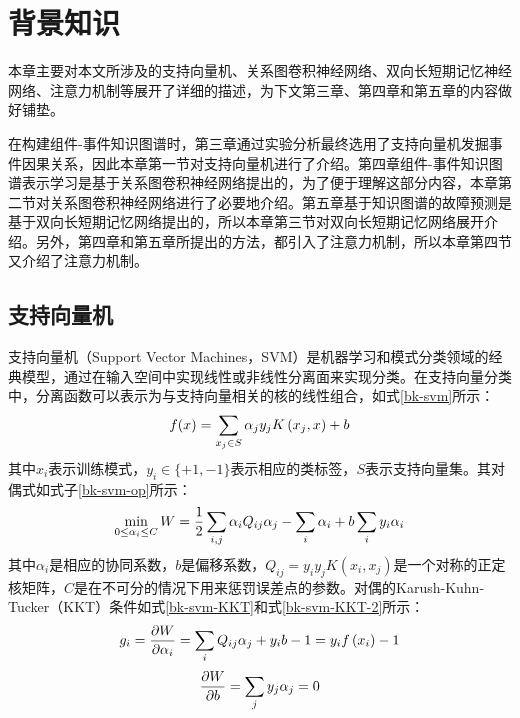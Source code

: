 \chapter{背景知识}
本章主要对本文所涉及的支持向量机、关系图卷积神经网络、双向长短期记忆神经网络、注意力机制等展开了详细的描述，为下文第三章、第四章和第五章的内容做好铺垫。

在构建组件-事件知识图谱时，第三章通过实验分析最终选用了支持向量机发掘事件因果关系，因此本章第一节对支持向量机进行了介绍。第四章组件-事件知识图谱表示学习是基于关系图卷积神经网络提出的，为了便于理解这部分内容，本章第二节对关系图卷积神经网络进行了必要地介绍。第五章基于知识图谱的故障预测是基于双向长短期记忆网络提出的，所以本章第三节对双向长短期记忆网络展开介绍。另外，第四章和第五章所提出的方法，都引入了注意力机制，所以本章第四节又介绍了注意力机制。

\section{支持向量机}
支持向量机（Support Vector Machines，SVM）是机器学习和模式分类领域的经典模型\cite{cherkassky2004practical}，通过在输入空间中实现线性或非线性分离面来实现分类。在支持向量分类中，分离函数可以表示为与支持向量相关的核的线性组合，如式\ref{bk-svm}所示：
\begin{equation}
    \centering
    f(x)=\sum_{x_{j} \in S} \alpha_{j} y_{j} K\left(x_{j}, x\right)+b
    \label{bk-svm}
\end{equation}
其中$x_{i}$表示训练模式，$y_{i} \in\{+1,-1\}$表示相应的类标签，$S$表示支持向量集\cite{cherkassky2004practical}。其对偶式如式子\ref{bk-svm-op}所示：
\begin{equation}
    \centering
    \min _{0 \leq \alpha_{i} \leq C} W=\frac{1}{2} \sum_{i, j} \alpha_{i} Q_{i j} \alpha_{j}-\sum_{i} \alpha_{i}+b \sum_{i} y_{i} \alpha_{i}
    \label{bk-svm-op}
\end{equation}
其中$\alpha_{i}$是相应的协同系数，$b$是偏移系数，$Q_{i j}=y_{i} y_{j} K\left(x_{i}, x_{j}\right)$是一个对称的正定核矩阵，$C$是在不可分的情况下用来惩罚误差点的参数\cite{cherkassky2004practical}。对偶的Karush-Kuhn-Tucker（KKT）条件如式\ref{bk-svm-KKT}和式\ref{bk-svm-KKT-2}所示：
\begin{equation}
    \centering
    g_{i}=\frac{\partial W}{\partial \alpha_{i}}=\sum_{i} Q_{i j} \alpha_{j}+y_{i} b-1=y_{i} f\left(x_{i}\right)-1
    \label{bk-svm-KKT}
\end{equation}
\begin{equation}
    \centering
    \frac{\partial W}{\partial b}=\sum_{j} y_{j} \alpha_{j}=0
    \label{bk-svm-KKT-2}
\end{equation}

